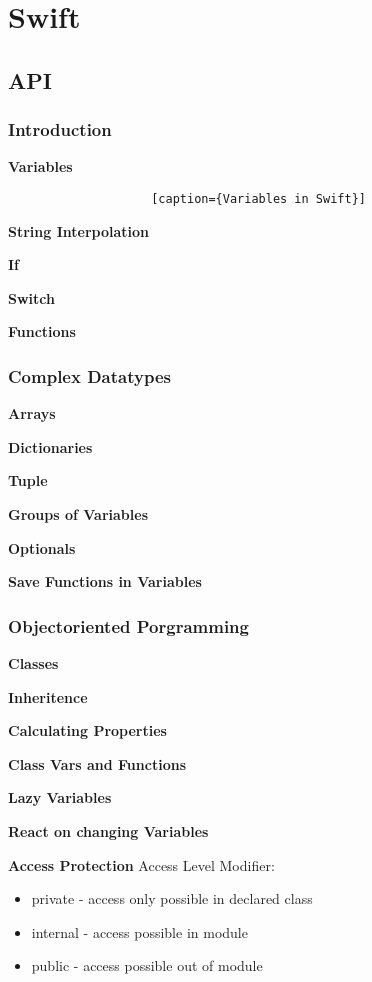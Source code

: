 \section{Swift}

	\subsection{API}

		\subsubsection{Introduction}

			\textbf{Variables}
				\begin{lstlisting}
					[caption={Variables in Swift}]

				\end{lstlisting}

			\textbf{String Interpolation}

			\textbf{If}

			\textbf{Switch}

			\textbf{Functions}

		\subsubsection{Complex Datatypes}

			\textbf{Arrays}

			\textbf{Dictionaries}

			\textbf{Tuple}

			\textbf{Groups of Variables}

			\textbf{Optionals}

			\textbf{Save Functions in Variables}

		\subsubsection{Objectoriented Porgramming}

			\textbf{Classes}

			\textbf{Inheritence}

			\textbf{Calculating Properties}

			\textbf{Class Vars and Functions}

			\textbf{Lazy Variables}

			\textbf{React on changing Variables}

			\textbf{Access Protection}
				Access Level Modifier:
				\begin{itemize} 
					\item private 	- access only possible in declared class
					\item internal 	- access possible in module
					\item public 	- access possible out of module
				\end{itemize}

